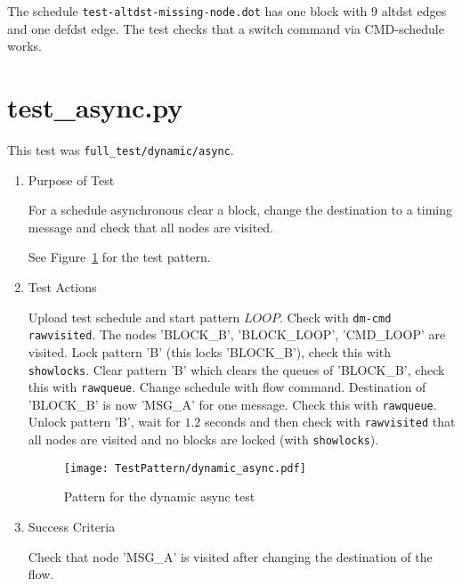 \documentclass[12pt,a4paper]{report}
\begin{document}
The schedule \texttt{test-altdst-missing-node.dot} has one block with 9
altdst edges and one defdst edge. The test checks that a switch command
via CMD-schedule works.

\section{test\_async.py}
This test was \texttt{full\_test/dynamic/async}.
\begin{enumerate}
  \item Purpose of Test

  For a schedule asynchronous clear a block, change the destination to
  a timing message and check that all nodes are visited.

  See Figure~\ref{fig:Pattern_for_the_dynamic_async_test} for the test pattern.
  \item Test Actions

  Upload test schedule and start pattern $LOOP$. Check with \texttt{dm-cmd rawvisited}. The
  nodes 'BLOCK\_B', 'BLOCK\_LOOP', 'CMD\_LOOP' are visited. Lock pattern 'B' (this locks 'BLOCK\_B'), check this with
  \texttt{showlocks}. Clear pattern 'B' which clears the queues of 'BLOCK\_B', check this with \texttt{rawqueue}.
  Change schedule with flow command. Destination of 'BLOCK\_B' is now 'MSG\_A' for one message. Check this
  with \texttt{rawqueue}. Unlock pattern 'B', wait for $1.2$ seconds and then check with \texttt{rawvisited} that all
  nodes are visited and no blocks are locked (with \texttt{showlocks}).
    \begin{figure}
        \centering
        \texttt{[image: TestPattern/dynamic\_async.pdf]}
        \caption{Pattern for the dynamic async test}
        \label{fig:Pattern_for_the_dynamic_async_test}
    \end{figure}
  \item Success Criteria

  Check that node 'MSG\_A' is visited after changing the destination of the flow.
\end{enumerate}
\end{document}
